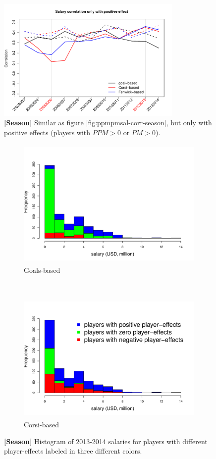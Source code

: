 \begin{figure}[htb!]
	\centering
	\includegraphics[width=0.8\textwidth]{figures/pos-ppmpmsal-corr-season.pdf}
	\caption{\textbf{[Season]} Similar as figure \ref{fig:ppmpmsal-corr-season}, but only with positive effects (players with $PPM>0$ or $PM>0$). }\label{fig:pos-ppmpmsal-corr-season}
\end{figure}

\begin{figure}[htb!]
	\centering
	\begin{subfigure}[t]{0.5\textwidth}
		\centering
		\includegraphics[height=2.5in]{figures/salaryhist-1314-goals-season.pdf}
		\caption{Goals-based}
	\end{subfigure}%
	~ 
	\begin{subfigure}[t]{0.5\textwidth}
		\centering
		\includegraphics[height=2.5in]{figures/salaryhist-1314-corsi-season.pdf}
		\caption{Corsi-based}
	\end{subfigure}
	\caption{\textbf{[Season]} Histogram of 2013-2014 salaries for players with different player-effects labeled in three different colors.}
\end{figure}

